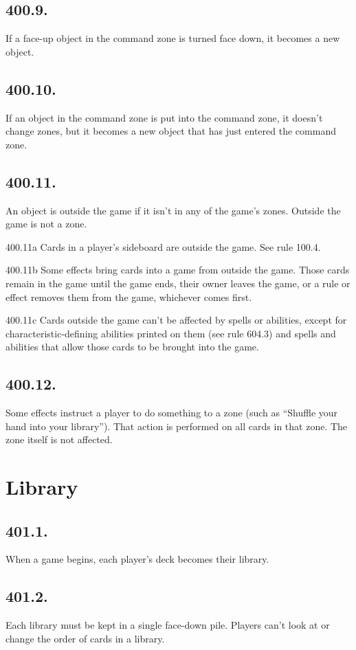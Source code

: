 \subsection*{400.9.}
If a face-up object in the command zone is turned face down, it becomes a new object.

\subsection*{400.10.}
If an object in the command zone is put into the command zone, it doesn’t change zones, but it becomes a new object that has just entered the command zone.

\subsection*{400.11.}
An object is outside the game if it isn’t in any of the game’s zones. Outside the game is not a zone.

400.11a Cards in a player’s sideboard are outside the game. See rule 100.4.

400.11b Some effects bring cards into a game from outside the game. Those cards remain in the game until the game ends, their owner leaves the game, or a rule or effect removes them from the game, whichever comes first.

400.11c Cards outside the game can’t be affected by spells or abilities, except for characteristic-defining abilities printed on them (see rule 604.3) and spells and abilities that allow those cards to be brought into the game.

\subsection*{400.12.}
Some effects instruct a player to do something to a zone (such as “Shuffle your hand into your library”). That action is performed on all cards in that zone. The zone itself is not affected.

\section{Library}
\subsection*{401.1.}
When a game begins, each player’s deck becomes their library.

\subsection*{401.2.}
Each library must be kept in a single face-down pile. Players can’t look at or change the order of cards in a library.

